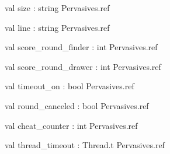 \documentclass[11pt]{article}
\begin{document}
\label{val:Server.size}\begin{ocamldoccode}
val size : string Pervasives.ref
\end{ocamldoccode}




\label{val:Server.line}\begin{ocamldoccode}
val line : string Pervasives.ref
\end{ocamldoccode}




\label{val:Server.score-underscoreround-underscorefinder}\begin{ocamldoccode}
val score_round_finder : int Pervasives.ref
\end{ocamldoccode}




\label{val:Server.score-underscoreround-underscoredrawer}\begin{ocamldoccode}
val score_round_drawer : int Pervasives.ref
\end{ocamldoccode}




\label{val:Server.timeout-underscoreon}\begin{ocamldoccode}
val timeout_on : bool Pervasives.ref
\end{ocamldoccode}




\label{val:Server.round-underscorecanceled}\begin{ocamldoccode}
val round_canceled : bool Pervasives.ref
\end{ocamldoccode}




\label{val:Server.cheat-underscorecounter}\begin{ocamldoccode}
val cheat_counter : int Pervasives.ref
\end{ocamldoccode}




\label{val:Server.thread-underscoretimeout}\begin{ocamldoccode}
val thread_timeout : Thread.t Pervasives.ref
\end{ocamldoccode}
\end{document}
